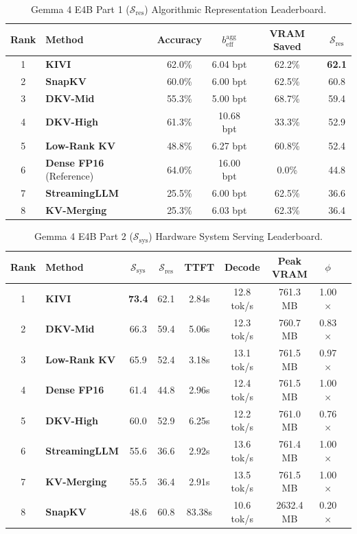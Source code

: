 \documentclass[10pt]{article}
\theoremstyle{definition}
\begin{document}
\begin{table}[h]
\vspace{6pt}
\centering
\small
\caption{Gemma 4 E4B Part 1 ($\mathcal{S}_{\text{res}}$) Algorithmic Representation Leaderboard.}
\label{tab:e4b_sres}
\begin{tabular}{clcccc}
\toprule
\textbf{Rank} & \textbf{Method} & \textbf{Accuracy} & $b_{\text{eff}}^{\text{agg}}$ & \textbf{VRAM Saved} & $\mathcal{S}_{\text{res}}$ \\
\midrule
1 & \textbf{KIVI} & 62.0\% & 6.04 bpt & 62.2\% & \textbf{62.1} \\
2 & \textbf{SnapKV} & 60.0\% & 6.00 bpt & 62.5\% & 60.8 \\
3 & \textbf{DKV-Mid} & 55.3\% & 5.00 bpt & 68.7\% & 59.4 \\
4 & \textbf{DKV-High} & 61.3\% & 10.68 bpt & 33.3\% & 52.9 \\
5 & \textbf{Low-Rank KV} & 48.8\% & 6.27 bpt & 60.8\% & 52.4 \\
6 & \textbf{Dense FP16} (Reference) & 64.0\% & 16.00 bpt & 0.0\% & 44.8 \\
7 & \textbf{StreamingLLM} & 25.5\% & 6.00 bpt & 62.5\% & 36.6 \\
8 & \textbf{KV-Merging} & 25.3\% & 6.03 bpt & 62.3\% & 36.4 \\
\bottomrule
\end{tabular}
\end{table}

\begin{table}[h]
\vspace{6pt}
\centering
\small
\caption{Gemma 4 E4B Part 2 ($\mathcal{S}_{\text{sys}}$) Hardware System Serving Leaderboard.}
\label{tab:e4b_ssys}
\begin{tabular}{clccccccc}
\toprule
\textbf{Rank} & \textbf{Method} & $\mathcal{S}_{\text{sys}}$ & $\mathcal{S}_{\text{res}}$ & \textbf{TTFT} & \textbf{Decode} & \textbf{Peak VRAM} & $\phi$ \\
\midrule
1 & \textbf{KIVI} & \textbf{73.4} & 62.1 & 2.84s & 12.8 tok/s & 761.3 MB & 1.00$\times$ \\
2 & \textbf{DKV-Mid} & 66.3 & 59.4 & 5.06s & 12.3 tok/s & 760.7 MB & 0.83$\times$ \\
3 & \textbf{Low-Rank KV} & 65.9 & 52.4 & 3.18s & 13.1 tok/s & 761.5 MB & 0.97$\times$ \\
4 & \textbf{Dense FP16} & 61.4 & 44.8 & 2.96s & 12.4 tok/s & 761.5 MB & 1.00$\times$ \\
5 & \textbf{DKV-High} & 60.0 & 52.9 & 6.25s & 12.2 tok/s & 761.0 MB & 0.76$\times$ \\
6 & \textbf{StreamingLLM} & 55.6 & 36.6 & 2.92s & 13.6 tok/s & 761.4 MB & 1.00$\times$ \\
7 & \textbf{KV-Merging} & 55.5 & 36.4 & 2.91s & 13.5 tok/s & 761.5 MB & 1.00$\times$ \\
8 & \textbf{SnapKV} & 48.6 & 60.8 & 83.38s & 10.6 tok/s & 2632.4 MB & 0.20$\times$ \\
\bottomrule
\end{tabular}
\end{table}
\end{document}
